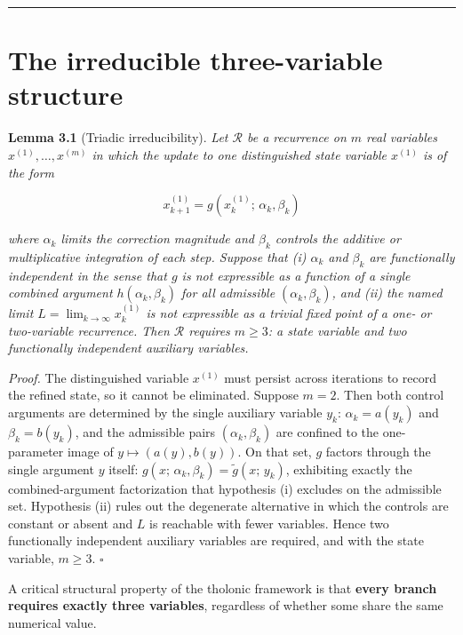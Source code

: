 \documentclass[12pt]{article}
\begin{document}
\begin{center}\rule{0.5\linewidth}{0.5pt}\end{center}

\section{The irreducible three-variable structure}\label{the-irreducible-three-variable-structure}

\textbf{Lemma 3.1} (Triadic irreducibility). \emph{Let \(\mathcal{R}\)
be a recurrence on \(m\) real variables \(x^{(1)}, \ldots, x^{(m)}\) in
which the update to one distinguished state variable \(x^{(1)}\) is of
the form}

\[x^{(1)}_{k+1} = g\!\left(x^{(1)}_k;\, \alpha_k, \beta_k\right)\]

\emph{where \(\alpha_k\) limits the correction magnitude and \(\beta_k\)
controls the additive or multiplicative integration of each step.
Suppose that (i) \(\alpha_k\) and \(\beta_k\) are functionally
independent in the sense that \(g\) is not expressible as a function of
a single combined argument \(h(\alpha_k, \beta_k)\) for all admissible
\((\alpha_k, \beta_k)\), and (ii) the named limit
\(L = \lim_{k\to\infty} x^{(1)}_k\) is not expressible as a trivial
fixed point of a one- or two-variable recurrence. Then \(\mathcal{R}\)
requires \(m \geq 3\): a state variable and two functionally independent
auxiliary variables.}

\emph{Proof.} The distinguished variable \(x^{(1)}\) must persist across
iterations to record the refined state, so it cannot be eliminated.
Suppose \(m = 2\). Then both control arguments are determined by the
single auxiliary variable \(y_k\): \(\alpha_k = a(y_k)\) and
\(\beta_k = b(y_k)\), and the admissible pairs \((\alpha_k, \beta_k)\)
are confined to the one-parameter image of \(y \mapsto (a(y), b(y))\).
On that set, \(g\) factors through the single argument \(y\) itself:
\(g(x;\, \alpha_k, \beta_k) = \tilde{g}(x;\, y_k)\), exhibiting exactly
the combined-argument factorization that hypothesis (i) excludes on the
admissible set. Hypothesis (ii) rules out the degenerate alternative in
which the controls are constant or absent and \(L\) is reachable with
fewer variables. Hence two functionally independent auxiliary variables
are required, and with the state variable, \(m \geq 3\). \(\square\)

A critical structural property of the tholonic framework is that
\textbf{every branch requires exactly three variables}, regardless of
whether some share the same numerical value.
\end{document}
